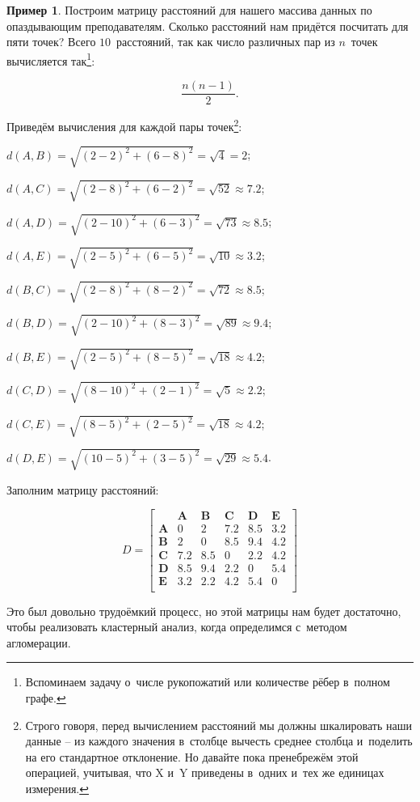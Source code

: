 \documentclass[12pt,a4paper]{article}
\theoremstyle{definition}
\newtheorem{example}{Пример}
\begin{document}
\begin{example}
Построим матрицу расстояний для нашего массива данных по опаздывающим преподавателям. 
Сколько расстояний нам придётся посчитать для пяти точек? Всего $10$~расстояний, так как 
число различных пар из $n$~точек вычисляется так\footnote{Вспоминаем задачу 
о~числе рукопожатий или количестве рёбер в~полном графе.}:

$$
\frac{n(n-1)}{2}.
$$

Приведём вычисления для каждой пары точек\footnote{Строго говоря, перед 
вычислением расстояний мы должны шкалировать наши данные – из каждого 
значения в~столбце вычесть среднее столбца и~поделить на его стандартное 
отклонение. Но давайте пока пренебрежём этой операцией, учитывая, что 
$\text{X}$ и~$\text{Y}$ приведены в~одних и~тех же единицах измерения.}:

$d(A, B) = \sqrt{(2-2)^2 + (6-8)^2} = \sqrt{4} = 2$;

$d(A, C) = \sqrt{(2-8)^2 + (6-2)^2} =  \sqrt{52} \approx 7.2$;

$d(A, D) = \sqrt{(2-10)^2 + (6-3)^2} = \sqrt{73} \approx 8.5$; 

$d(A, E) = \sqrt{(2-5)^2 + (6-5)^2} = \sqrt{10} \approx 3.2$;

$d(B, C) = \sqrt{(2-8)^2 + (8-2)^2} = \sqrt{72} \approx 8.5$; 

$d(B, D) = \sqrt{(2-10)^2 + (8-3)^2} = \sqrt{89} \approx 9.4$; 

$d(B, E) = \sqrt{(2-5)^2 + (8-5)^2} = \sqrt{18} \approx 4.2$; 

$d(C, D) = \sqrt{(8-10)^2 + (2-1)^2} = \sqrt{5} \approx 2.2$; 

 $d(C, E) = \sqrt{(8-5)^2 + (2-5)^2} = \sqrt{18} \approx 4.2$; 
 
 $d(D, E) = \sqrt{(10-5)^2 + (3-5)^2} = \sqrt{29} \approx 5.4$. 

Заполним матрицу расстояний:

$$
D = \begin{bmatrix}
& \bm{A} & \bm{B} & \bm{C} & \bm{D} & \bm{E} \\
\bm{A} & 0 & 2 & 7.2 & 8.5 & 3.2 \\
\bm{B} & 2 & 0 & 8.5 & 9.4 & 4.2 \\
\bm{C} & 7.2 & 8.5 & 0 &  2.2 & 4.2 \\
\bm{D} & 8.5 & 9.4 & 2.2 & 0 & 5.4\\
\bm{E} & 3.2 & 2.2 & 4.2 & 5.4  & 0\\
\end{bmatrix}
$$

Это был довольно трудоёмкий процесс, но этой матрицы нам будет достаточно, чтобы 
реализовать кластерный анализ, когда определимся с~методом агломерации.
\end{example}
\end{document}
